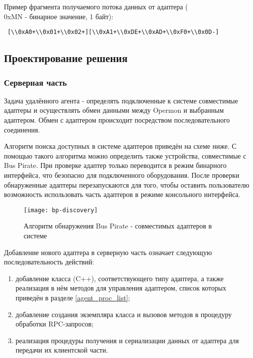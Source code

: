 Пример фрагмента получаемого потока данных от адаптера (\\0xMN - бинарное значение, 1 байт):

\begin{verbatim}
 [\\0xA0+\\0x01+\\0x02+][\\0xA1+\\0xDE+\\0xAD+\\0xF0+\\0x0D-]
\end{verbatim}

\subsection{Проектирование решения}

\subsubsection{Серверная часть}

Задача удалённого агента - определять подключенные к системе совместимые адаптеры и осуществлять обмен данными между Opermon и выбранным адаптером. Обмен с адаптером происходит посредством последовательного соединения.

Алгоритм поиска доступных в системе адаптеров приведён на схеме ниже. С помощью такого алгоритма можно определить также устройства, совместимые с Bus Pirate. При проверке адаптер только переводится в режим бинарного интерфейса, что безопасно для подключенного оборудования. После проверки обнаруженные адаптеры перезапускаются для того, чтобы оставить пользователю возможность использовать часть адаптеров в режиме консольного интерфейса.

\begin{figure}[H]
 \centering
 \texttt{[image: bp-discovery]}
 \caption{Алгоритм обнаружения Bus Pirate - совместимых адаптеров в системе}
 \label{fig:bp-discovery}
\end{figure}

Добавление нового адаптера в серверную часть означает следующую последовательность действий:

\begin{enumerate}
 \item добавление класса (C++), соответствующего типу адаптера, а также реализация в нём методов для управления адаптером, список которых приведён в разделе \ref{agent_proc_list};
 \item добавление создания экземпляра класса и вызовов методов в процедуру обработки RPC-запросов;
 \item реализация процедуры получения и сериализации данных от адаптера для передачи их клиентской части.
\end{enumerate}


